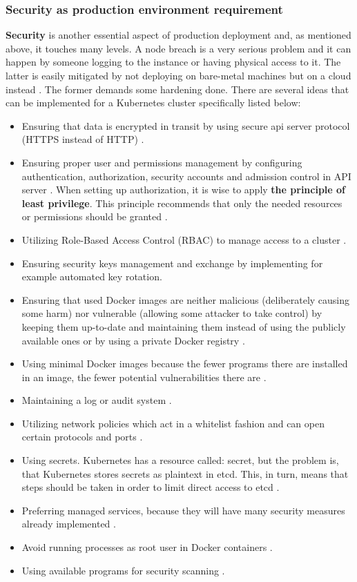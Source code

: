 \subsubsection{Security as production environment requirement}
\textbf{Security} is another essential aspect of production deployment and, as mentioned above, it touches many levels. A node breach is a very serious problem and it can happen by someone logging to the instance or having physical access to it. The latter is easily mitigated by not deploying on bare-metal machines but on a cloud instead \cite{book-mastering-k8s}. The former demands some hardening done. There are several ideas that can be implemented for a Kubernetes cluster specifically listed below:
\begin{itemize}
\item Ensuring that data is encrypted in transit by using secure api server protocol (HTTPS instead of HTTP) \cite{book-mastering-k8s}.
\item Ensuring proper user and permissions management by configuring authentication, authorization, security accounts and admission control in API server \cite{book-mastering-k8s}. When setting up authorization, it is wise to apply \textbf{the principle of least privilege}. This principle recommends that only the needed resources or permissions should be granted \cite{book-cndwk}.
\item Utilizing Role-Based Access Control (RBAC) to manage access to a cluster \cite{book-cndwk}.
\item Ensuring security keys management and exchange \cite{book-mastering-k8s} by implementing for example automated key rotation.
\item Ensuring that used Docker images are neither malicious (deliberately causing some harm) nor vulnerable (allowing some attacker to take control) by keeping them up-to-date and maintaining them instead of using the publicly available ones or by using a private Docker registry \cite{book-mastering-k8s}.
\item Using minimal Docker images because the fewer programs there are installed in an image, the fewer potential vulnerabilities there are \cite{book-cndwk}.
\item Maintaining a log or audit system \cite{book-mastering-k8s}.
\item Utilizing network policies which act in a whitelist fashion and can open certain protocols and ports \cite{book-mastering-k8s}.
\item Using secrets. Kubernetes has a resource called: secret, but the problem is, that Kubernetes stores secrets as plaintext in etcd. This, in turn, means that steps should be taken in order to limit direct access to etcd \cite{book-mastering-k8s}.
\item Preferring managed services, because they will have many security measures already implemented \cite{book-cndwk}.
\item Avoid running processes as root user in Docker containers \cite{book-cndwk}.
\item Using available programs for security scanning \cite{book-cndwk}.
\end{itemize}

